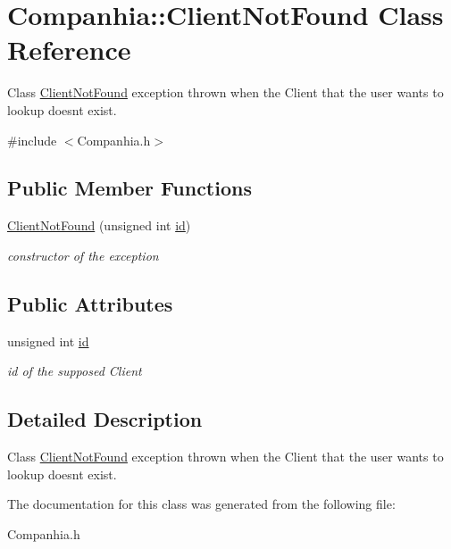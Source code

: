 \hypertarget{class_companhia_1_1_client_not_found}{}\section{Companhia\+:\+:Client\+Not\+Found Class Reference}
\label{class_companhia_1_1_client_not_found}


Class \hyperlink{class_companhia_1_1_client_not_found}{Client\+Not\+Found} exception thrown when the Client that the user wants to lookup doesn\textquotesingle{}t exist.  




{\ttfamily \#include $<$Companhia.\+h$>$}

\subsection*{Public Member Functions}
\begin{DoxyCompactItemize}
\item 
\mbox{\label{class_companhia_1_1_client_not_found_aecff42161e8a59be74c3f1c344b4eb61}} 
\hyperlink{class_companhia_1_1_client_not_found_aecff42161e8a59be74c3f1c344b4eb61}{Client\+Not\+Found} (unsigned int \hyperlink{class_companhia_1_1_client_not_found_a6c047450cfdc5988d9fa6eb9d2af1335}{id})
\begin{DoxyCompactList}\small\item\em constructor of the exception \end{DoxyCompactList}\end{DoxyCompactItemize}
\subsection*{Public Attributes}
\begin{DoxyCompactItemize}
\item 
\mbox{\label{class_companhia_1_1_client_not_found_a6c047450cfdc5988d9fa6eb9d2af1335}} 
unsigned int \hyperlink{class_companhia_1_1_client_not_found_a6c047450cfdc5988d9fa6eb9d2af1335}{id}
\begin{DoxyCompactList}\small\item\em id of the supposed Client \end{DoxyCompactList}\end{DoxyCompactItemize}


\subsection{Detailed Description}
Class \hyperlink{class_companhia_1_1_client_not_found}{Client\+Not\+Found} exception thrown when the Client that the user wants to lookup doesn\textquotesingle{}t exist. 

The documentation for this class was generated from the following file\+:\begin{DoxyCompactItemize}
\item 
Companhia.\+h\end{DoxyCompactItemize}
